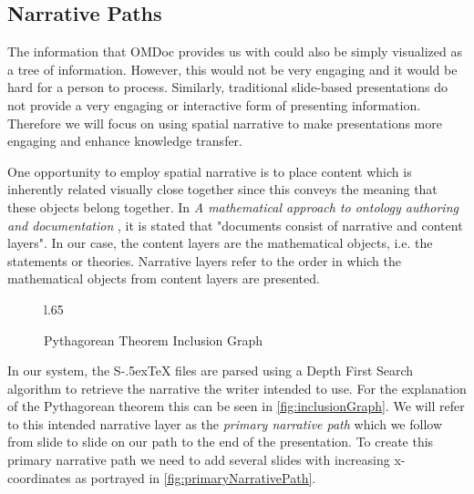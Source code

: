 \documentclass{llncs}
\def\stex{\texorpdfstring{\raisebox{-.5ex}S\kern-.5ex\TeX}{sTeX}\xspace}
\begin{document}
\subsection{Narrative Paths}
\label{sec:narrativePaths}

The information that OMDoc provides us with could also be simply visualized as a tree of information. However, this would not be very engaging and it would be hard for a person to process. Similarly, traditional slide-based presentations do not provide a very engaging or interactive form of presenting information. Therefore we will focus on using spatial narrative to make presentations more engaging and enhance knowledge transfer. 

One opportunity to employ spatial narrative is to place content which is inherently related visually close together since this conveys the meaning that these objects belong together. In \textit{A mathematical approach to ontology authoring and documentation} \cite{LK:MathOntoAuthDoc09}, it is stated that "documents consist of narrative and content layers". In our case, the content layers are the mathematical objects, i.e. the statements or theories. Narrative layers refer to the order in which the mathematical objects from content layers are presented.

\begin{figure}l{.65\textwidth}\vspace{-2em}
  \vspace{-1.8em}
  \caption{Pythagorean Theorem Inclusion Graph}\label{fig:inclusionGraph}
  \vspace{-2em}
\end{figure}

In our system, the \stex files are parsed using a Depth First Search algorithm to retrieve the narrative the writer intended to use. For the explanation of the Pytha\-go\-rean theorem this can be seen in \autoref{fig:inclusionGraph}. We will refer to this intended narrative layer as the \textit{primary narrative path} which we follow from slide to slide on our path to the end of the presentation. To create this primary narrative path we need to add several slides with increasing x-coordinates as portrayed in \autoref{fig:primaryNarrativePath}.
\end{document}
